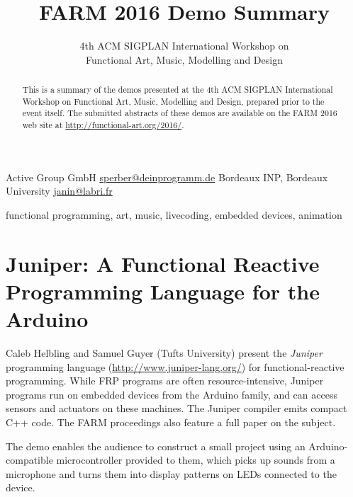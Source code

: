 \documentclass{sigplanconf}
\begin{document}
\toappear

\setlength{\pdfpageheight}{\paperheight}
\setlength{\pdfpagewidth}{\paperwidth}


\title{FARM 2016 Demo Summary}
\subtitle{4th ACM SIGPLAN International Workshop on \\ Functional Art, Music, Modelling and Design}

           {Active Group GmbH}
           {\url{sperber@deinprogramm.de}}
           {Bordeaux INP, Bordeaux University}
           {\url{janin@labri.fr}}

\maketitle

\begin{abstract}
  This is a summary of the demos presented at the 4th ACM SIGPLAN
  International Workshop on Functional Art, Music, Modelling and
  Design, prepared prior to the event itself.  The submitted abstracts
  of these demos are available on the FARM 2016 web site at
  \url{http://functional-art.org/2016/}.
\end{abstract}


\keywords
functional programming, art, music, livecoding, embedded devices, animation

\section{Juniper: A Functional Reactive Programming Language for the Arduino}

Caleb Helbling and Samuel Guyer (Tufts University) present the
\textit{Juniper} programming language (\url{http://www.juniper-lang.org/}) for functional-reactive
programming.  While FRP programs are often resource-intensive, Juniper
programs run on embedded devices from the Arduino family, and can
access sensors and actuators on these machines.  The Juniper compiler
emits compact C++ code.  The FARM proceedings also feature a full
paper on the subject.

The demo enables the audience to construct a small project using an
Arduino-compatible microcontroller provided to them, which
picks up sounds from a microphone and turns them into display patterns
on LEDs connected to the device.
\end{document}
